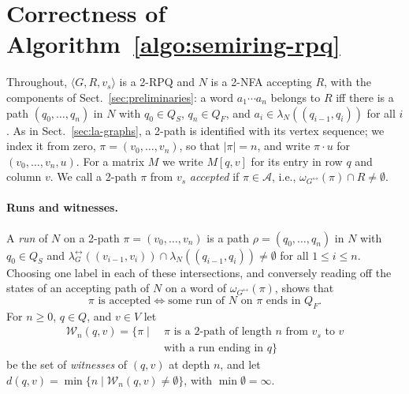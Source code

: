 \section{Correctness of Algorithm~\ref{algo:semiring-rpq}}\label{app:correctness}

Throughout, $\langle G, R, v_s \rangle$ is a 2-RPQ and $N$ is a 2-NFA accepting $R$, with the components of Sect.~\ref{sec:preliminaries}: a word $a_1 \cdots a_n$ belongs to $R$ iff there is a path $(q_0, \ldots, q_n)$ in $N$ with $q_0 \in Q_S$, $q_n \in Q_F$, and $a_i \in \lambda_N((q_{i-1}, q_i))$ for all $i$.
As in Sect.~\ref{sec:la-graphs}, a 2-path is identified with its vertex sequence; we index it from zero, $\pi = (v_0, \ldots, v_n)$, so that $|\pi| = n$, and write $\pi \cdot u$ for $(v_0, \ldots, v_n, u)$.
For a matrix $M$ we write $M[q, v]$ for its entry in row $q$ and column $v$.
We call a 2-path $\pi$ from $v_s$ \emph{accepted} if $\pi \in \mathcal{A}$, i.e., $\omega_{G^\leftrightarrow}(\pi) \cap R \neq \emptyset$.

\paragraph{Runs and witnesses.}
A \emph{run} of $N$ on a 2-path $\pi = (v_0, \ldots, v_n)$ is a path $\rho = (q_0, \ldots, q_n)$ in $N$ with $q_0 \in Q_S$ and $\lambda_G^\leftrightarrow((v_{i-1}, v_i)) \cap \lambda_N((q_{i-1}, q_i)) \neq \emptyset$ for all $1 \leq i \leq n$.
Choosing one label in each of these intersections, and conversely reading off the states of an accepting path of $N$ on a word of $\omega_{G^\leftrightarrow}(\pi)$, shows that
\begin{equation}\label{eq:accept}
	\pi \text{ is accepted} \iff \text{some run of } N \text{ on } \pi \text{ ends in } Q_F.
\end{equation}
For $n \geq 0$, $q \in Q$, and $v \in V$ let
\begin{align*}
	\mathcal{W}_n(q, v) = \{ \pi \mid \ & \pi \text{ is a 2-path of length } n \text{ from } v_s \text{ to } v \\
	                                    & \text{with a run ending in } q \}
\end{align*}
be the set of \emph{witnesses} of $(q, v)$ at depth $n$, and let $d(q, v) = \min \{ n \mid \mathcal{W}_n(q, v) \neq \emptyset \}$, with $\min \emptyset = \infty$.

